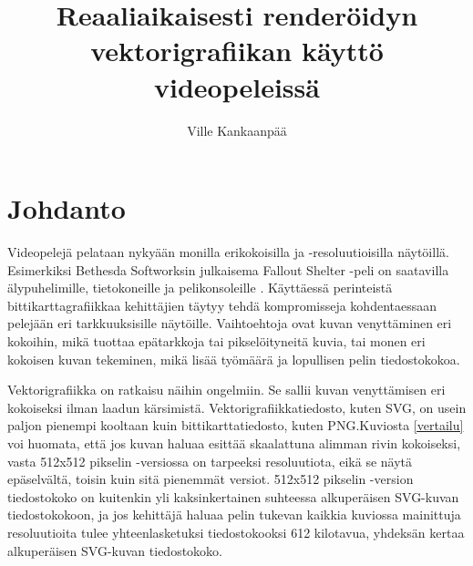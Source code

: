 \documentclass[utf8,bachelor]{gradu3}
\begin{document}
\title{Reaaliaikaisesti renderöidyn vektorigrafiikan käyttö videopeleissä}


\author{Ville Kankaanpää}

\maketitle

\mainmatter


\chapter{Johdanto}

Videopelejä pelataan nykyään monilla erikokoisilla ja -resoluutioisilla näytöillä. Esimerkiksi Bethesda Softworksin julkaisema Fallout Shelter -peli on saatavilla älypuhelimille, tietokoneille ja pelikonsoleille \parencite{RefWorks:doc:5bd6d887e4b0a1f99c62e6de}. Käyttäessä perinteistä bittikarttagrafiikkaa kehittäjien täytyy tehdä kompromisseja kohdentaessaan pelejään eri tarkkuuksisille näytöille. Vaihtoehtoja ovat kuvan venyttäminen eri kokoihin, mikä tuottaa epätarkkoja tai pikselöityneitä kuvia, tai monen eri kokoisen kuvan tekeminen, mikä lisää työmäärä ja lopullisen pelin tiedostokokoa. \parencite{RefWorks:doc:5bd8319de4b03ae5c9b276b8}

Vektorigrafiikka on ratkaisu näihin ongelmiin. Se sallii kuvan venyttämisen eri kokoiseksi ilman laadun kärsimistä. Vektorigrafiikkatiedosto, kuten SVG, on usein paljon pienempi kooltaan kuin bittikarttatiedosto, kuten PNG.Kuviosta \ref{vertailu} voi huomata, että jos kuvan haluaa esittää skaalattuna alimman rivin kokoiseksi, vasta 512x512 pikselin -versiossa on tarpeeksi resoluutiota, eikä se näytä epäselvältä, toisin kuin sitä pienemmät versiot. 512x512 pikselin -version tiedostokoko on kuitenkin yli kaksinkertainen suhteessa alkuperäisen SVG-kuvan tiedostokokoon, ja jos kehittäjä haluaa pelin tukevan kaikkia kuviossa mainittuja resoluutioita tulee yhteenlasketuksi tiedostokooksi 612 kilotavua, yhdeksän kertaa alkuperäisen SVG-kuvan tiedostokoko.
\end{document}

